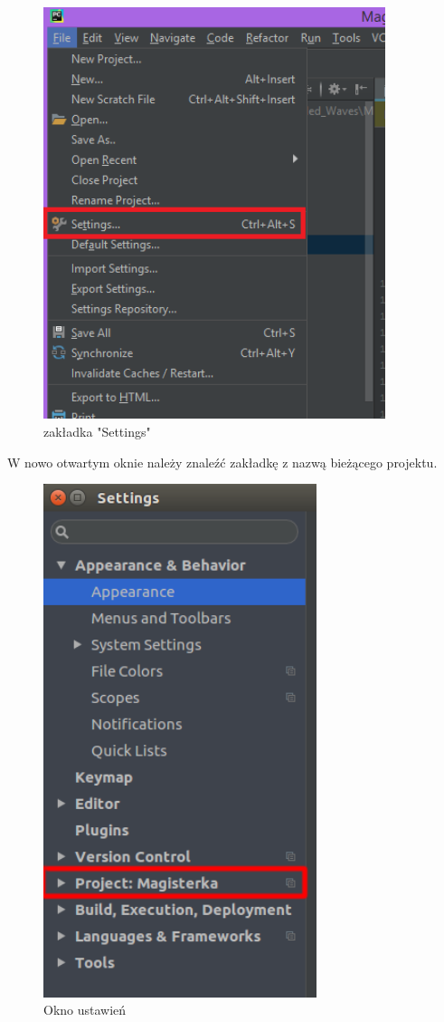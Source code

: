 \begin{figure}[h]
\centering
\includegraphics[width=10cm]{Zdjecia/5/kasia/settingsA}
\caption{zakładka "Settings"}
\label{fig:file}
\end{figure}

W nowo otwartym oknie należy znaleźć zakładkę z nazwą bieżącego projektu.

\begin{figure}[h]
\centering
\includegraphics[width=8cm]{Zdjecia/5/kasia/settings2A}
\caption{Okno ustawień}
\label{fig:file}
\end{figure}


